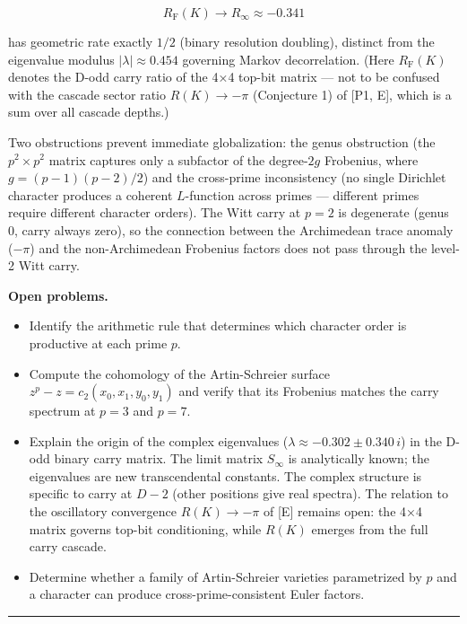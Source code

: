 \documentclass[
  11pt,
]{article}
\providecommand{\tightlist}{%
  \setlength{\itemsep}{0pt}\setlength{\parskip}{0pt}}
\begin{document}
\[R_{\mathrm{F}}(K) \to R_\infty \approx -0.341\]

has geometric rate exactly \(1/2\) (binary resolution doubling), distinct from
the eigenvalue modulus \(\lvert\lambda\rvert \approx 0.454\) governing Markov
decorrelation. (Here \(R_{\mathrm{F}}(K)\) denotes the D-odd carry ratio of the
4×4 top-bit matrix --- not to be confused with the cascade sector ratio
\(R(K) \to -\pi\) (Conjecture 1) of {[}P1, E{]}, which is a sum over all cascade
depths.)

Two obstructions prevent immediate globalization: the genus obstruction (the
\(p^2 \times p^2\) matrix captures only a subfactor of the degree-\(2g\)
Frobenius, where \(g = (p-1)(p-2)/2\)) and the cross-prime inconsistency (no
single Dirichlet character produces a coherent \(L\)-function across primes ---
different primes require different character orders). The Witt carry at
\(p = 2\) is degenerate (genus 0, carry always zero), so the connection between
the Archimedean trace anomaly (\(-\pi\)) and the non-Archimedean Frobenius
factors does not pass through the level-2 Witt carry.

\textbf{Open problems.}

\begin{itemize}
\tightlist
\item
  Identify the arithmetic rule that determines which character order is
  productive at each prime \(p\).
\item
  Compute the cohomology of the Artin-Schreier surface
  \(z^p - z = c_2(x_0, x_1, y_0, y_1)\) and verify that its Frobenius matches
  the carry spectrum at \(p = 3\) and \(p = 7\).
\item
  Explain the origin of the complex eigenvalues
  (\(\lambda \approx -0.302 \pm 0.340\,i\)) in the D-odd binary carry matrix.
  The limit matrix \(S_\infty\) is analytically known; the eigenvalues are new
  transcendental constants. The complex structure is specific to carry at
  \(D-2\) (other positions give real spectra). The relation to the oscillatory
  convergence \(R(K) \to -\pi\) of {[}E{]} remains open: the 4×4 matrix governs
  top-bit conditioning, while \(R(K)\) emerges from the full carry cascade.
\item
  Determine whether a family of Artin-Schreier varieties parametrized by \(p\)
  and a character can produce cross-prime-consistent Euler factors.
\end{itemize}

\begin{center}\rule{0.5\linewidth}{0.5pt}\end{center}
\end{document}
